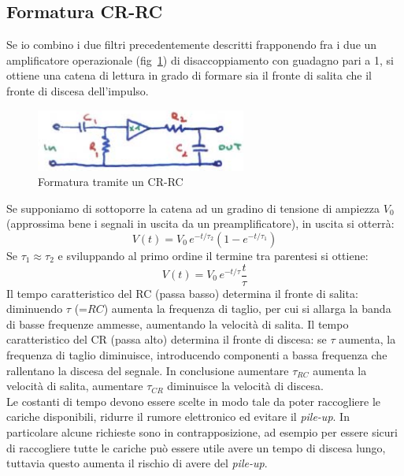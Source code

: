 \subsection{Formatura CR-RC}
Se io combino i due filtri precedentemente descritti frapponendo fra i due un amplificatore operazionale (fig~\ref{fig:filtroCRRC}) di disaccoppiamento con guadagno pari a 1,
si ottiene una catena di lettura in grado di formare sia il fronte di salita che il fronte di discesa dell'impulso.
\begin{figure}[htbp]
\begin{center}
\includegraphics[scale=1]{./Immagini/FiltroCRRC.png}
\caption{Formatura tramite un CR-RC}
\label{fig:filtroCRRC}
\end{center}
\end{figure}
Se supponiamo di sottoporre la catena ad un gradino di tensione di ampiezza $V_0$ (approssima bene i segnali in uscita da un preamplificatore), in uscita si otterr\`a:
\begin{equation*}
V(t) = V_0 \, e^{-t/\tau_2}(1 - e^{-t/\tau_1}) 
\end{equation*}
Se $\tau_1 \approx \tau_2$ e sviluppando al primo ordine il termine tra parentesi si ottiene:
\begin{equation*}
V(t) = V_0 \, e^{-t / \tau} \frac{t}{\tau}
\end{equation*}
Il tempo caratteristico del RC (passa basso) determina il fronte di salita: diminuendo $\tau$ (=$RC$) aumenta la frequenza di taglio, per cui si allarga la banda di basse frequenze ammesse, aumentando la velocit\`a di salita.
Il tempo caratteristico del CR (passa alto) determina il fronte di discesa: se $\tau$ aumenta, la frequenza di taglio diminuisce, introducendo componenti a bassa frequenza che rallentano la discesa del segnale.
In conclusione aumentare $\tau_{RC}$ aumenta la velocit\`a di salita, aumentare $\tau_{CR}$ diminuisce la velocit\`a di discesa.\\
Le costanti di tempo devono essere scelte in modo tale da poter raccogliere le cariche disponibili, ridurre il rumore elettronico ed evitare il \textit{pile-up}.
In particolare alcune richieste sono in contrapposizione, ad esempio per essere sicuri di raccogliere tutte le cariche pu\`o essere utile avere un tempo di discesa lungo, 
tuttavia questo aumenta il rischio di avere del \textit{pile-up}. 
